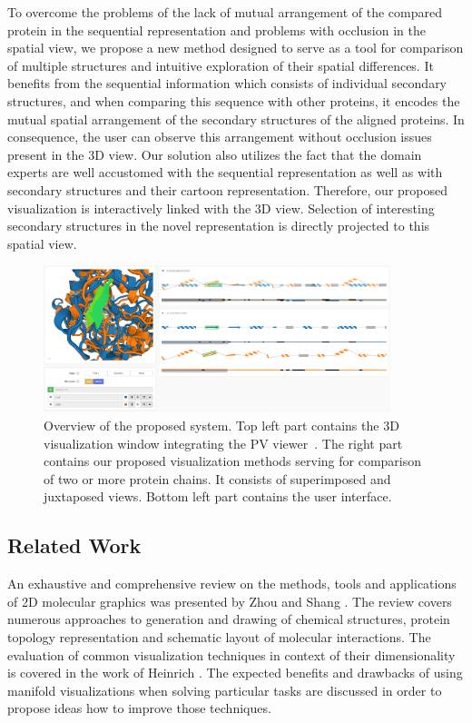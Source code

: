 \documentclass[twocolumn]{bmcart}%
\begin{document}
To overcome the problems of the lack of mutual arrangement of the compared protein in the sequential representation and problems with occlusion in the spatial view, we propose a new method designed to serve as a tool for comparison of multiple structures and intuitive exploration of their spatial differences.
It benefits from the sequential information which consists of individual secondary structures, and when comparing this sequence with other proteins, it encodes the mutual spatial arrangement of the secondary structures of the aligned proteins.
In consequence, the user can observe this arrangement without occlusion issues present in the 3D view.
Our solution also utilizes the fact that the domain experts are well accustomed with the sequential representation as well as with secondary structures and their cartoon representation. 
Therefore, our proposed visualization is interactively linked with the 3D view.
Selection of interesting secondary structures in the novel representation is directly projected to this spatial view. 

\begin{figure}[t]
  \centering
  \includegraphics[width=0.9\textwidth]{pics/flattening_design2.png}
  \caption{Overview of the proposed system. Top left part contains the 3D visualization window integrating the PV viewer~\cite{biasini2014}. The right part contains our proposed visualization methods serving for comparison of two or more protein chains. It consists of superimposed and juxtaposed views. Bottom left part contains the user interface.}
  \label{fig:design}
\end{figure}

\subsection*{Related Work}

An exhaustive and comprehensive review on the methods, tools and applications of 2D molecular graphics was presented by Zhou and Shang \cite{Zhou2009}. 
The review covers numerous approaches to generation and drawing of chemical structures, protein topology representation and schematic layout of molecular interactions.
The evaluation of common visualization techniques in context of their dimensionality is covered in the work of Heinrich \cite{Heinrich2014}.
The expected benefits and drawbacks of using manifold visualizations when solving particular tasks are discussed in order to propose ideas how to improve those techniques.
\end{document}
